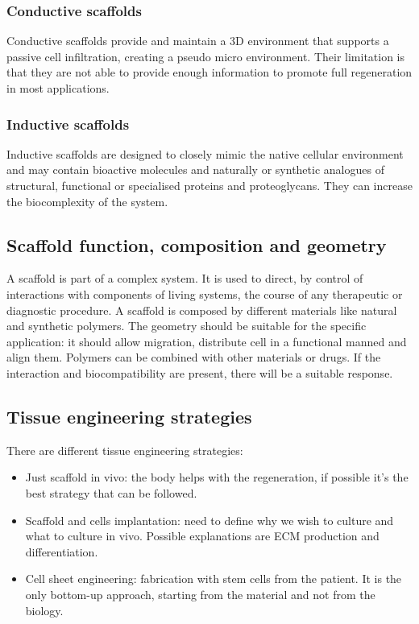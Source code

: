         \subsubsection{Conductive scaffolds}
        Conductive scaffolds provide and maintain a 3D environment that supports a passive cell infiltration, creating a pseudo micro environment.
        Their limitation is that they are not able to provide enough information to promote full regeneration in most applications.

        \subsubsection{Inductive scaffolds}
        Inductive scaffolds are designed to closely mimic the native cellular environment and may contain bioactive molecules and naturally or synthetic analogues of structural, functional or specialised proteins and proteoglycans.
        They can increase the biocomplexity of the system.

    \subsection{Scaffold function, composition and geometry}
    A scaffold is part of a complex system.
    It is used to direct, by control of interactions with components of living systems, the course of any therapeutic or diagnostic procedure.
    A scaffold is composed by different materials like natural and synthetic polymers.
    The geometry should be suitable for the specific application: it should allow migration, distribute cell in a functional manned and align them.
    Polymers can be combined with other materials or drugs.
    If the interaction and biocompatibility are present, there will be a suitable response.

    \subsection{Tissue engineering strategies}
    There are different tissue engineering strategies:

    \begin{multicols}{2}
        \begin{itemize}
            \item Just scaffold in vivo: the body helps with the regeneration, if possible it’s the best strategy that can be followed.
            \item Scaffold and cells implantation: need to define why we wish to culture and what to culture in vivo.
                Possible explanations are ECM production and differentiation.
            \item Cell sheet engineering: fabrication with stem cells from the patient.
                It is the only bottom-up approach, starting from the material and not from the biology.
        \end{itemize}
    \end{multicols}


